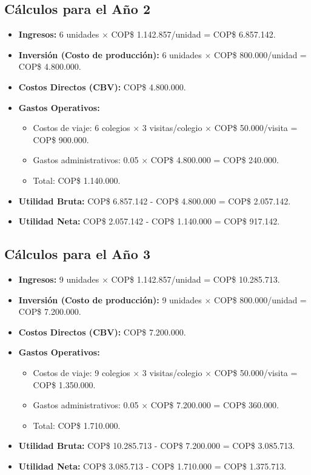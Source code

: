 \subsection*{Cálculos para el Año 2}
\begin{itemize}
    \item \textbf{Ingresos:} 6 unidades $\times$ COP\$ 1.142.857/unidad = 
			COP\$ 6.857.142.
    \item \textbf{Inversión (Costo de producción):} 
			6 unidades $\times$ COP\$ 800.000/unidad = COP\$ 4.800.000.
    \item \textbf{Costos Directos (CBV):} COP\$ 4.800.000.
    \item \textbf{Gastos Operativos:}
    \begin{itemize}
        \item Costos de viaje: 6 colegios $\times$ 3 visitas/colegio $\times$ 
					COP\$ 50.000/visita = COP\$ 900.000.
        \item Gastos administrativos: 
					0.05 $\times$ COP\$ 4.800.000 = COP\$ 240.000.
        \item Total: COP\$ 1.140.000.
    \end{itemize}
    \item \textbf{Utilidad Bruta:} COP\$ 6.857.142 - COP\$ 4.800.000 = COP\$ 2.057.142.
    \item \textbf{Utilidad Neta:} COP\$ 2.057.142 - COP\$ 1.140.000 = COP\$ 917.142.
\end{itemize}

\subsection*{Cálculos para el Año 3}
\begin{itemize}
    \item \textbf{Ingresos:} 9 unidades $\times$ COP\$ 1.142.857/unidad = 
			COP\$ 10.285.713.
    \item \textbf{Inversión (Costo de producción):} 
			9 unidades $\times$ COP\$ 800.000/unidad = COP\$ 7.200.000.
    \item \textbf{Costos Directos (CBV):} COP\$ 7.200.000.
    \item \textbf{Gastos Operativos:}
    \begin{itemize}
        \item Costos de viaje: 
					9 colegios $\times$ 3 visitas/colegio $\times$ COP\$ 50.000/visita = 
					COP\$ 1.350.000.
        \item Gastos administrativos: 0.05 $\times$ COP\$ 7.200.000 = 
					COP\$ 360.000.
        \item Total: COP\$ 1.710.000.
    \end{itemize}
    \item \textbf{Utilidad Bruta:} COP\$ 10.285.713 - COP\$ 7.200.000 = COP\$ 3.085.713.
    \item \textbf{Utilidad Neta:} COP\$ 3.085.713 - COP\$ 1.710.000 = COP\$ 1.375.713.
\end{itemize}

